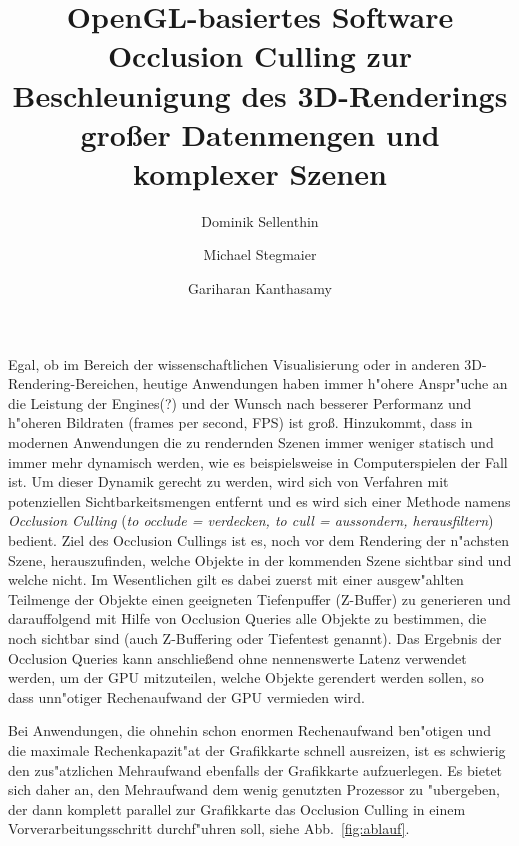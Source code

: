 \documentclass[journal]{vgtc}
\author{Dominik Sellenthin \and Michael Stegmaier \and Gariharan Kanthasamy}
\title{OpenGL-basiertes Software Occlusion Culling zur Beschleunigung des 3D-Renderings gro{\ss}er Datenmengen und komplexer Szenen}
\begin{document}


\maketitle

Egal, ob im Bereich der wissenschaftlichen Visualisierung oder in anderen 3D-Rendering-Bereichen, heutige Anwendungen haben immer h"ohere Anspr"uche an die Leistung der Engines(?) und der Wunsch nach besserer Performanz und h"oheren Bildraten (frames per second, FPS) ist gro{\ss}. Hinzukommt, dass in modernen Anwendungen die zu rendernden Szenen immer weniger statisch und immer mehr dynamisch werden, wie es beispielsweise in Computerspielen der Fall ist. Um dieser Dynamik gerecht zu werden, wird sich von Verfahren mit potenziellen Sichtbarkeitsmengen entfernt\cite{MSOC} und es wird sich einer Methode namens \textit{Occlusion Culling} (\textit{to occlude = verdecken, to cull = aussondern, herausfiltern}) bedient. Ziel des Occlusion Cullings ist es, noch vor dem Rendering der n"achsten Szene, herauszufinden, welche Objekte in der kommenden Szene sichtbar sind und welche nicht. Im Wesentlichen gilt es dabei zuerst mit einer ausgew"ahlten Teilmenge der Objekte einen geeigneten Tiefenpuffer (Z-Buffer) zu generieren und darauffolgend mit Hilfe von Occlusion Queries alle Objekte zu bestimmen, die noch sichtbar sind (auch Z-Buffering oder Tiefentest genannt). Das Ergebnis der Occlusion Queries kann anschlie{\ss}end ohne nennenswerte Latenz verwendet werden, um der GPU mitzuteilen, welche Objekte gerendert werden sollen, so dass unn"otiger Rechenaufwand der GPU vermieden wird.

Bei Anwendungen, die ohnehin schon enormen Rechenaufwand ben"otigen und die maximale Rechenkapazit"at der Grafikkarte schnell ausreizen, ist es schwierig den zus"atzlichen Mehraufwand ebenfalls der Grafikkarte aufzuerlegen. Es bietet sich daher an, den Mehraufwand dem wenig genutzten Prozessor zu "ubergeben, der dann komplett parallel zur Grafikkarte das Occlusion Culling in einem Vorverarbeitungsschritt durchf"uhren soll, siehe Abb.\ \ref{fig:ablauf}.
\end{document}
